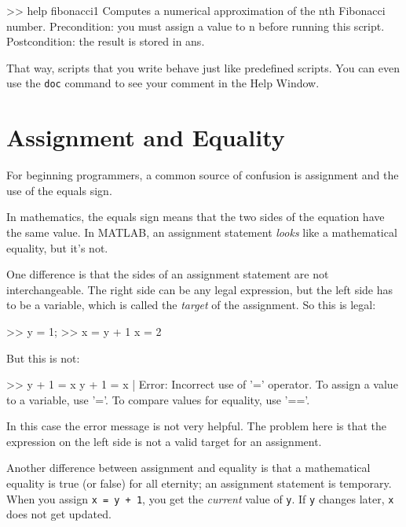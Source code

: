 \begin{code}
>> help fibonacci1
  Computes a numerical approximation of the nth Fibonacci number.
  Precondition: you must assign a value to n before running this script.
  Postcondition: the result is stored in ans.
\end{code}

That way, scripts that you write behave just like predefined scripts.
You can even use the \lstinline{doc} command to see your comment in the
Help Window.


\section{Assignment and Equality}

For beginning programmers, a common source of confusion is assignment and the use of the equals sign.


In mathematics, the equals sign means that the two sides of the
equation have the same value.
In MATLAB, an assignment statement \emph{looks} like a mathematical equality, but it's not.

One difference is that the sides of an assignment statement are not
interchangeable.  The right side can be any legal expression, but
the left side has to be a variable, which is called the
\emph{target} of the assignment.  So this is legal:

\begin{code}
>> y = 1;
>> x = y + 1
x = 2
\end{code}

But this is not:

\begin{code}
>> y + 1 = x
 y + 1 = x
       |
Error: Incorrect use of '=' operator.
To assign a value to a variable, use '='.
To compare values for equality, use '=='.
\end{code}

In this case the error message is not very helpful.  The problem here is that the expression on the left side is not a valid target for an assignment.


Another difference between assignment and equality is that a mathematical equality is true (or false) for all eternity;
an assignment statement is temporary.
When you assign \lstinline{x = y + 1}, you get the
\emph{current} value of \lstinline{y}.  If \lstinline{y} changes later, \lstinline{x}
does not get updated.

